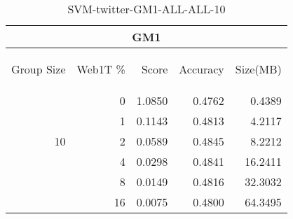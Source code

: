 \begin{center}
\begin{table}[htbp] 
 \begin{center}
\begin{tabular}{ | r | r | r | r | r |}
\hline
\multicolumn{5}{|c|}{GM1}\\
\hline
\begin{sideways}Group Size\end{sideways} & \begin{sideways}Web1T \%\end{sideways} & \begin{sideways}Score\end{sideways} & \begin{sideways}Accuracy\end{sideways} & \begin{sideways}Size(MB)\end{sideways}\\
\hline
\multirow{5}{*}{10}
 & 0 & 1.0850 & 0.4762 & 0.4389\\ \cline{2-5}
 & 1 & 0.1143 & 0.4813 & 4.2117\\ \cline{2-5}
 & 2 & 0.0589 & 0.4845 & 8.2212\\ \cline{2-5}
 & 4 & 0.0298 & 0.4841 & 16.2411\\ \cline{2-5}
 & 8 & 0.0149 & 0.4816 & 32.3032\\ \cline{2-5}
 & 16 & 0.0075 & 0.4800 & 64.3495\\ \cline{2-5}
\hline
\end{tabular}
\caption{SVM-twitter-GM1-ALL-ALL-10}
\label{table:SVM-twitter-GM1-ALL-ALL-10}
\end{center}
 \end{table}
\end{center}

